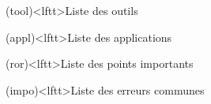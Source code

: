 \documentclass[../../main/main.tex]{subfiles}
\begin{document}
{	\begin{tcb}(tool)<lftt>{Liste des outils}
	\end{tcb}
	\vspace{-10pt}
	\begin{tcb}(appl)<lftt>{Liste des applications}
	\end{tcb}
	\vspace{-10pt}
	\begin{tcb}(ror)<lftt>{Liste des points importants}
	\end{tcb}
	\vspace{-10pt}
	\begin{tcb}(impo)<lftt>{Liste des erreurs communes}
	\end{tcb}
}
\newpage
\end{document}
